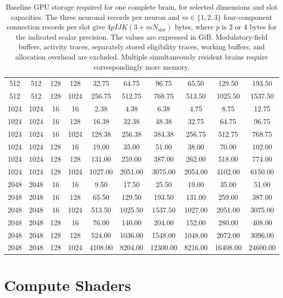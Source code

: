 \documentclass[12pt,a4paper]{article}
\begin{document}
\begin{table}[h]
{\begin{tabular}{cccc|ccc|ccc}
		512 & 512 & 128 & 128 & 32.75 & 64.75 & 96.75 & 65.50 & 129.50 & 193.50 \\
		512 & 512 & 128 & 1024 & 256.75 & 512.75 & 768.75 & 513.50 & 1025.50 & 1537.50 \\
		\midrule
		1024 & 1024 & 16 & 16 & 2.38 & 4.38 & 6.38 & 4.75 & 8.75 & 12.75 \\
		1024 & 1024 & 16 & 128 & 16.38 & 32.38 & 48.38 & 32.75 & 64.75 & 96.75 \\
		1024 & 1024 & 16 & 1024 & 128.38 & 256.38 & 384.38 & 256.75 & 512.75 & 768.75 \\
		1024 & 1024 & 128 & 16 & 19.00 & 35.00 & 51.00 & 38.00 & 70.00 & 102.00 \\
		1024 & 1024 & 128 & 128 & 131.00 & 259.00 & 387.00 & 262.00 & 518.00 & 774.00 \\
		1024 & 1024 & 128 & 1024 & 1027.00 & 2051.00 & 3075.00 & 2054.00 & 4102.00 & 6150.00 \\
		\midrule
		2048 & 2048 & 16 & 16 & 9.50 & 17.50 & 25.50 & 19.00 & 35.00 & 51.00 \\
		2048 & 2048 & 16 & 128 & 65.50 & 129.50 & 193.50 & 131.00 & 259.00 & 387.00 \\
		2048 & 2048 & 16 & 1024 & 513.50 & 1025.50 & 1537.50 & 1027.00 & 2051.00 & 3075.00 \\
		2048 & 2048 & 128 & 16 & 76.00 & 140.00 & 204.00 & 152.00 & 280.00 & 408.00 \\
		2048 & 2048 & 128 & 128 & 524.00 & 1036.00 & 1548.00 & 1048.00 & 2072.00 & 3096.00 \\
		2048 & 2048 & 128 & 1024 & 4108.00 & 8204.00 & 12300.00 & 8216.00 & 16408.00 & 24600.00 \\
		\bottomrule
		\end{tabular}%
		}
		\caption{\footnotesize{Baseline GPU storage required for one complete brain, for selected dimensions and slot capacities. The three neuronal records per neuron and $m\in\{1,2,3\}$ four-component connection records per slot give $4pIJK(3+mN_{\mathrm{slot}})$ bytes, where $p$ is 2 or 4 bytes for the indicated scalar precision. The values are expressed in GiB. Modulatory-field buffers, activity traces, separately stored eligibility traces, working buffers, and allocation overhead are excluded. Multiple simultaneously resident brains require correspondingly more memory.}}
	\end{table}
	
\section{Compute Shaders}
\end{document}
